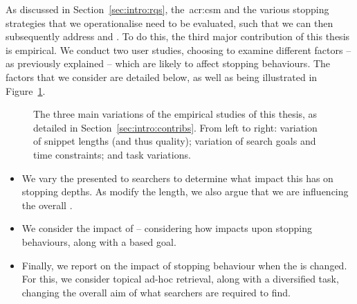 \noindent
{}
As discussed in Section~\ref{sec:intro:rqs}, the~\gls{acr:csm} and the various stopping strategies that we operationalise need to be evaluated, such that we can then subsequently address  and . To do this, the third major contribution of this thesis is empirical. We conduct two user studies, choosing to examine different factors -- as previously explained -- which are likely to affect stopping behaviours. The factors that we consider are detailed below, as well as being illustrated in Figure~\ref{fig:ch1-empirical}.

\begin{figure}[t!]
    \centering
    \caption[Empirical study variations]{The three main variations of the empirical studies of this thesis, as detailed in Section~\ref{sec:intro:contribs}. From left to right: variation of snippet lengths (and thus quality); variation of search goals and time constraints; and task variations.}
    \label{fig:ch1-empirical}
\end{figure}

\begin{itemize}
    
    \item{We vary the  presented to searchers to determine what impact this has on stopping depths. As modify the length, we also argue that we are influencing the overall .}
    
    \item{We consider the impact of  -- considering how  impacts upon stopping behaviours, along with a  based goal.}
    
    \item{Finally, we report on the impact of stopping behaviour when the  is changed. For this, we consider topical ad-hoc retrieval, along with a diversified task, changing the overall aim of what searchers are required to find.}
    
\end{itemize}


